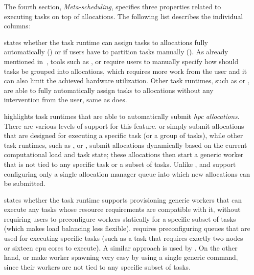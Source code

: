 The fourth section, \emph{Meta-scheduling}, specifies three properties related to executing tasks
on top of allocations. The following list describes the individual columns:

\begin{description}[wide=0pt,itemsep=0pt,topsep=4pt]
	\item[Graph partitioning] states whether the task runtime can assign tasks to allocations fully automatically (\automaticmap)
		or if users have to partition tasks manually (\manualmap). As already mentioned
		in~, tools such as \pegasus{}, \autosubmit{} or
		\snakemake{} require users to manually specify how should tasks be grouped into
		allocations, which requires more work from the user and it can also limit the achieved hardware
		utilization. Other task runtimes, such as \dask{} or \balsam{}, are
		able to fully automatically assign tasks to allocations without any intervention from the user,
		same as \hyperqueue{} does.

	\item[Automatic allocation] highlights task runtimes that are able to automatically submit \emph{\gls{hpc} allocations}. There are
		various levels of support for this feature. \snakemake{} or \autosubmit{}
		simply submit allocations that are designed for executing a specific task (or a group of tasks),
		while other task runtimes, such as \dask{}, \balsam{} or
		\hyperqueue{}, submit allocations dynamically based on the current computational load and
		task state; these allocations then start a generic worker that is not tied to any specific task or
		a subset of tasks. Unlike \hyperqueue{}, \dask{} and
		\balsam{} support configuring only a single allocation manager queue into which new
		allocations can be submitted.

	\item[Generic workers] states whether the task runtime supports provisioning generic workers that can execute any tasks
		whose resource requirements are compatible with it, without requiring users to preconfigure workers
		statically for a specific subset of tasks (which makes load balancing less flexible).
		\merlin{} requires preconfiguring queues that are used for executing specific tasks
		(such as a task that requires exactly two nodes or sixteen \gls{cpu} cores to
		execute). A similar approach is used by \parsl{}. On the other hand,
		\dask{} or \hyperqueue{} make worker spawning very easy by using a single
		generic command, since their workers are not tied to any specific subset of tasks.
\end{description}

